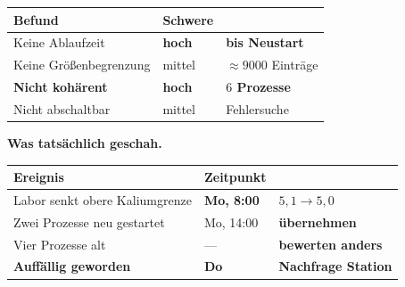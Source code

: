 \begin{merksatz}
\begin{center}
{\small
\renewcommand{\arraystretch}{1.45}
\begin{tabular}{@{}P{3.0cm}P{2.2cm}P{2.6cm}@{}}
\toprule
\textbf{Befund} & \textbf{Schwere} & \\
\midrule
Keine Ablaufzeit & \textcolor{akzent}{\textbf{hoch}} & \textbf{bis Neustart}\\
Keine Größenbegrenzung & \textcolor{mittel}{mittel} & $\approx9000$ Einträge\\
\textbf{Nicht kohärent} & \textcolor{akzent}{\textbf{hoch}} & \textcolor{akzent}{\textbf{$6$ Prozesse}}\\
Nicht abschaltbar & \textcolor{mittel}{mittel} & \textcolor{akzent}{Fehlersuche}\\
\bottomrule
\end{tabular}}
\end{center}

\begin{center}
\begin{minipage}{0.88\textwidth}
\end{minipage}
\end{center}

\textbf{Was tatsächlich geschah.}

\begin{center}
\renewcommand{\arraystretch}{1.45}
\begin{tabular}{@{}P{3.0cm}P{2.2cm}P{2.6cm}@{}}
\toprule
\textbf{Ereignis} & \textbf{Zeitpunkt} & \\
\midrule
Labor senkt obere Kaliumgrenze & \textbf{Mo, 8:00} & $5{,}1 \to 5{,}0$\\
Zwei Prozesse neu gestartet & Mo, 14:00 & \textcolor{akzent}{\textbf{übernehmen}}\\
Vier Prozesse alt & --- & \textcolor{akzent}{\textbf{bewerten anders}}\\
\textbf{Auffällig geworden} & \textcolor{akzent}{\textbf{Do}} & \textcolor{akzent}{\textbf{Nachfrage Station}}\\
\bottomrule
\end{tabular}
\end{center}

\begin{center}
\end{center}
\end{merksatz}


